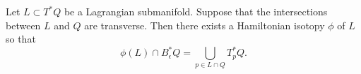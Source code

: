 

    Let $L\subset T^*Q$ be a Lagrangian submanifold.
    Suppose that the intersections between $L$ and $Q$ are transverse.
    Then there exists a Hamiltonian isotopy $\phi$ of $L$ so that
    \[\phi(L)\cap B^*_\epsilon Q=\bigcup_{p\in L\cap Q} T^*_pQ.\]

